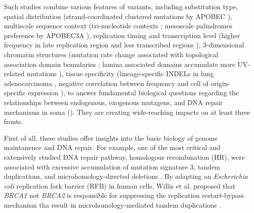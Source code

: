 \documentclass[phd,tocprelim]{cornell}
\begin{document}
Such studies combine various features of variants, including substitution type, spatial distribution (strand-coordinated clustered mutations by APOBEC \cite{Shi2017-cd}), multiscale sequence context (tri-nucleotide contexts \cite{alexandrov2013}; mesoscale palindromes preference by APOBEC3A \cite{Buisson2019-ue}), replication timing and transcription level (higher frequency in late replication region and less transcribed regions \cite{Lawrence2013-zx}), 3-dimensional chromatin structures (mutation rate change associated with topological association domain boundaries \cite{Akdemir2020-hn}; lamina associated domains accumulate more UV-related mutations \cite{Garcia-Nieto2017-ox}), tissue specificity (lineage-specific INDELs in lung adenocarcinoma \cite{imielinski2017}, negative correlation between frequency and cell of origin-specific expression \cite{polak2015}), to answer fundamental biological questions regarding the relationships between endogenous, exogenous mutagens, and DNA repair mechanisms in soma (\cite{Zou2021-je,Volkova2020-zg,Vohringer2021-bv}). They are creating wide-reaching impacts on at least three fronts.

First of all, these studies offer insights into the basic biology of genome maintanence and DNA repair. For example, one of the most critical and extensively studied DNA repair pathway, homologous recombination (HR), were associated with excessive accumulation of mutation signature 3, tandem duplications, and microhomology-directed deletions \cite{Nik-Zainal2016-bz}. By adapting an \textit{Escherichia coli} replication fork barrier (RFB) in human cells, Willis et al. proposed that \textit{BRCA1} not \textit{BRCA2} is responsible for suppressing the replication restart-bypass mechanism tha result in microhomology-mediated tandem duplications \cite{Willis2017-bw}.
\end{document}
